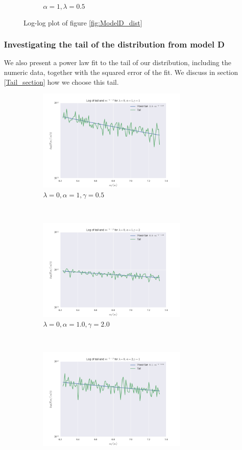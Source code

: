 \documentclass[a4paper, 10pt]{article}
\begin{document}
\begin{figure}[!ht]
\begin{subfigure}[H!]{0.5\textwidth}
        \caption{$\alpha = 1, \lambda=0.5$}
    \end{subfigure}
\caption{Log-log plot of figure \ref{fig:ModelD_dist}} \label{fig:ModelD_dist_log}
\end{figure}
\newpage
\subsubsection{Investigating the tail of the distribution from model D}
We also present a power law fit to the tail of our distribution, including the numeric data, together with the squared error of the fit. We discuss in section \ref{Tail_section} how we choose this tail. 
\begin{figure}[!ht] %
	\centering
    \begin{subfigure}[H!]{0.5\textwidth}
        \centering
        \includegraphics[height=2.0in]{tailL0A1G1.png} %
        \caption{$\lambda=0, \alpha=1, \gamma = 0.5$}
    \end{subfigure}%
    ~ 
    \begin{subfigure}[H!]{0.5\textwidth}
        \centering
        \includegraphics[height=2.0in]{tailL0A1G2.png}
        \caption{$\lambda = 0, \alpha = 1.0, \gamma=2.0$}
    \end{subfigure}
     ~
    \begin{subfigure}[H!]{0.5\textwidth}
        \centering
        \includegraphics[height=2.0in]{tailL0A2G1.png}

\end{subfigure}
\end{figure}
\end{document}
